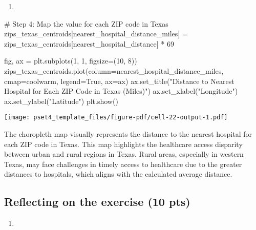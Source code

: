 \documentclass[
  letterpaper,
  DIV=11,
  numbers=noendperiod]{scrartcl}
\newenvironment{Shaded}{\begin{snugshade}}{\end{snugshade}}
\newcommand{\CommentTok}[1]{\textcolor[rgb]{0.37,0.37,0.37}{#1}}
\newcommand{\DecValTok}[1]{\textcolor[rgb]{0.68,0.00,0.00}{#1}}
\newcommand{\NormalTok}[1]{\textcolor[rgb]{0.00,0.23,0.31}{#1}}
\newcommand{\OperatorTok}[1]{\textcolor[rgb]{0.37,0.37,0.37}{#1}}
\newcommand{\StringTok}[1]{\textcolor[rgb]{0.13,0.47,0.30}{#1}}
\newcommand{\VariableTok}[1]{\textcolor[rgb]{0.07,0.07,0.07}{#1}}
\providecommand{\tightlist}{%
  \setlength{\itemsep}{0pt}\setlength{\parskip}{0pt}}\usepackage{longtable,booktabs,array}
\begin{document}
\begin{enumerate}
\def\labelenumi{\alph{enumi}.}
\setcounter{enumi}{1}
\tightlist
\item
\end{enumerate}

\begin{Shaded}
\begin{Highlighting}[]
\CommentTok{\# Step 4: Map the value for each ZIP code in Texas}
\NormalTok{zips\_texas\_centroids[}\StringTok{\textquotesingle{}nearest\_hospital\_distance\_miles\textquotesingle{}}\NormalTok{] }\OperatorTok{=}\NormalTok{ zips\_texas\_centroids[}\StringTok{\textquotesingle{}nearest\_hospital\_distance\textquotesingle{}}\NormalTok{] }\OperatorTok{*} \DecValTok{69}

\NormalTok{fig, ax }\OperatorTok{=}\NormalTok{ plt.subplots(}\DecValTok{1}\NormalTok{, }\DecValTok{1}\NormalTok{, figsize}\OperatorTok{=}\NormalTok{(}\DecValTok{10}\NormalTok{, }\DecValTok{8}\NormalTok{))}
\NormalTok{zips\_texas\_centroids.plot(column}\OperatorTok{=}\StringTok{\textquotesingle{}nearest\_hospital\_distance\_miles\textquotesingle{}}\NormalTok{, cmap}\OperatorTok{=}\StringTok{\textquotesingle{}coolwarm\textquotesingle{}}\NormalTok{, legend}\OperatorTok{=}\VariableTok{True}\NormalTok{, ax}\OperatorTok{=}\NormalTok{ax)}
\NormalTok{ax.set\_title(}\StringTok{"Distance to Nearest Hospital for Each ZIP Code in Texas (Miles)"}\NormalTok{)}
\NormalTok{ax.set\_xlabel(}\StringTok{"Longitude"}\NormalTok{)}
\NormalTok{ax.set\_ylabel(}\StringTok{"Latitude"}\NormalTok{)}
\NormalTok{plt.show()}
\end{Highlighting}
\end{Shaded}

\texttt{[image: pset4\_template\_files/figure-pdf/cell-22-output-1.pdf]}

The choropleth map visually represents the distance to the nearest
hospital for each ZIP code in Texas. This map highlights the healthcare
access disparity between urban and rural regions in Texas. Rural areas,
especially in western Texas, may face challenges in timely access to
healthcare due to the greater distances to hospitals, which aligns with
the calculated average distance.

\subsection{Reflecting on the exercise (10
pts)}\label{reflecting-on-the-exercise-10-pts}

\begin{enumerate}
\def\labelenumi{\arabic{enumi}.}
\tightlist
\item
\end{enumerate}
\end{document}
